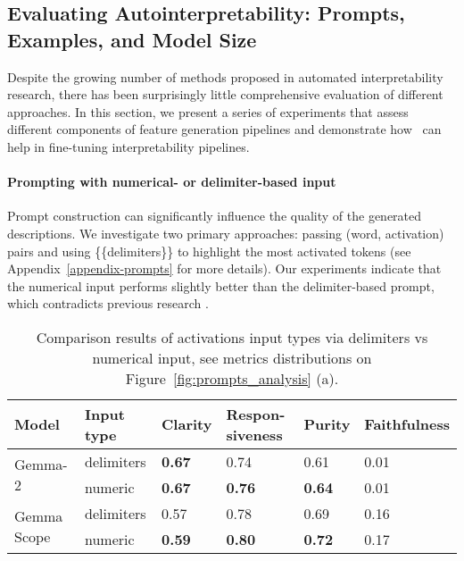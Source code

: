 \subsection{Evaluating Autointerpretability: Prompts, Examples, and Model Size}

Despite the growing number of methods proposed in automated interpretability research, there has been surprisingly little comprehensive evaluation of different approaches. In this section, we present a series of experiments that assess different components of feature generation pipelines and demonstrate how \ours\ can help in fine-tuning interpretability pipelines. 

\paragraph{Prompting with numerical- or delimiter-based input}
Prompt construction can significantly influence the quality of the generated descriptions. We investigate two primary approaches: passing (word, activation) pairs and using \{\{delimiters\}\} to highlight the most activated tokens (see Appendix~\ref{appendix-prompts} for more details). 
Our experiments indicate that the numerical input performs slightly better than the delimiter-based prompt, which contradicts previous research \cite{choi2024automatic}.

\begin{table}[t]
\scriptsize
\centering
\begin{tabular}{p{0.7cm}p{0.8cm}p{0.8cm}p{0.8cm}p{0.8cm}p{1.2cm}} 
Model                     & Input type          & Clarity          & Respon-siveness   & Purity        & Faithfulness \\ \hline \hline 
\multirow{2}{1cm}{Gemma-2} &  delimiters         &    \textbf{0.67}     &   0.74      &  0.61     & 0.01 \\ 
                          &  numeric            &    \textbf{0.67}     &   \textbf{0.76}      &  \textbf{0.64}     & 0.01  \\ \hline
\multirow{2}{1cm}{Gemma Scope}&  delimiters     &    0.57     &   0.78      &  0.69     & 0.16 \\  
                          &  numeric            &    \textbf{0.59}     &   \textbf{0.80}      &  \textbf{0.72}     & 0.17 \\ \hline 
\end{tabular}
\caption{Comparison results of activations input types via delimiters vs numerical input, see metrics distributions on Figure~\ref{fig:prompts_analysis} (a). }
\label{tab:numberical-vs-delimeters}
\end{table}

